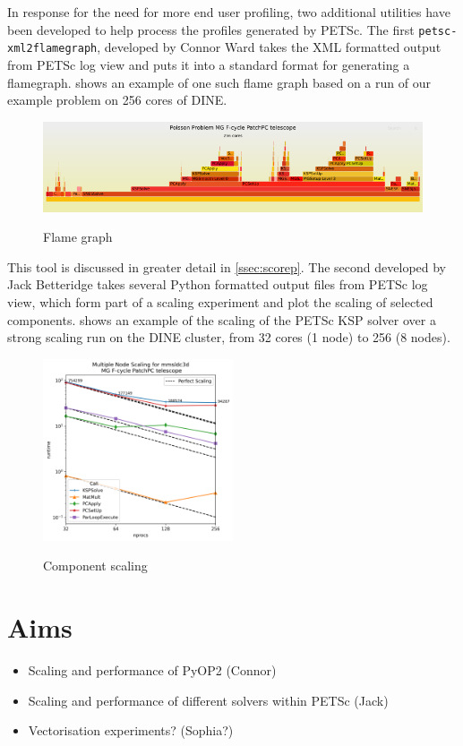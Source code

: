 \documentclass[a4paper,11pt]{article}
\newenvironment{jacknotes}{\color{red}\renewcommand{\labelitemi}{$\star$}\begin{itemize}}{\end{itemize}}
\begin{document}
In response for the need for more end user profiling, two additional utilities have been developed to help process the profiles generated by PETSc.
The first \verb`petsc-xml2flamegraph`, developed by Connor Ward takes the XML formatted output from PETSc log view and puts it into a standard format for generating a flamegraph.
 shows an example of one such flame graph based on a run of our example problem on 256 cores of DINE.
\begin{figure}[htp]
	\centering
	\includegraphics[width=\textwidth]{256_flame.pdf}
	\label{fig:flame}
	\caption{Flame graph}
\end{figure}
This tool is discussed in greater detail in \cref{ssec:scorep}.
The second developed by Jack Betteridge takes several Python formatted output files from PETSc log view, which form part of a scaling experiment and plot the scaling of selected components.
 shows an example of the scaling of the PETSc KSP solver over a strong scaling run on the DINE cluster, from 32 cores (1 node) to 256 (8 nodes).
\begin{figure}[htp]
	\centering
	\includegraphics[width=0.5\textwidth]{main_stage_absolute.png}
	\label{fig:component}
	\caption{Component scaling}
\end{figure}


\section{Aims}
\label{sec:aims}
\begin{jacknotes}
	\item Scaling and performance of PyOP2 (Connor)
	\item Scaling and performance of different solvers within PETSc (Jack)
	\item Vectorisation experiments? (Sophia?)
\end{jacknotes}
\end{document}
